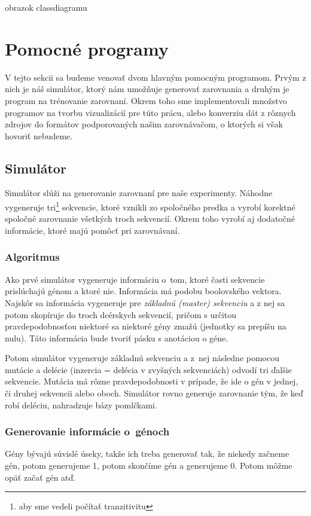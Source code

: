 \todo obrazok classdiagramu

\section{Pomocné programy}
V tejto sekcii sa budeme venovať dvom hlavným pomocným programom. Prvým z nich je náš simulátor, ktorý nám umožňuje generovať zarovnania a druhým je program na trénovanie zarovnaní. Okrem toho sme implementovali množstvo programov na tvorbu vizualizácií pre túto prácu, alebo konverziu dát z rôznych zdrojov do formátov podporovaných našim zarovnávačom, o ktorých si však hovoriť nebudeme.
\subsection{Simulátor}

Simulátor slúži na generovanie zarovnaní pre naše experimenty. Náhodne vygeneruje tri\footnote{aby sme vedeli počítať tranzitivitu} sekvencie, ktoré vznikli zo spoločného predka a vyrobí korektné spoločné zarovnanie všetkých troch sekvencií. Okrem toho vyrobí aj dodatočné informácie, ktoré majú pomôcť pri zarovnávaní.

\subsubsection{Algoritmus}
Ako prvé simulátor vygeneruje informáciu o~tom, ktoré časti sekvencie prislúchajú génom a ktoré nie. Informácia má podobu boolovského vektora.
Najskôr sa informácia vygeneruje pre \textit{základnú (master) sekvenciu} a z nej sa potom skopíruje do troch dcérskych sekvencií, pričom s určitou pravdepodobnosťou niektoré sa niektoré gény zmažú (jednotky sa prepíšu na nulu). Táto informácia bude tvoriť pásku s anotáciou o géne.

Potom simulátor vygeneruje základnú sekvenciu a z~nej následne pomocou mutácie a delécie (inzercia = delécia v zvyšných sekvenciách) odvodí tri ďalšie sekvencie. Mutácia má rôzne pravdepodobnosti v prípade, že ide o gén v jednej, či druhej sekvencii alebo oboch.
Simulátor rovno generuje zarovnanie tým, že keď robí deléciu, nahradzuje bázy pomlčkami.


\subsubsection{Generovanie informácie o~génoch}
Gény bývajú súvislé úseky, takže ich treba generovať tak, že niekedy začneme gén, potom generujeme 1, potom skončíme gén a generujeme 0. Potom môžme opäť začať gén atď.

